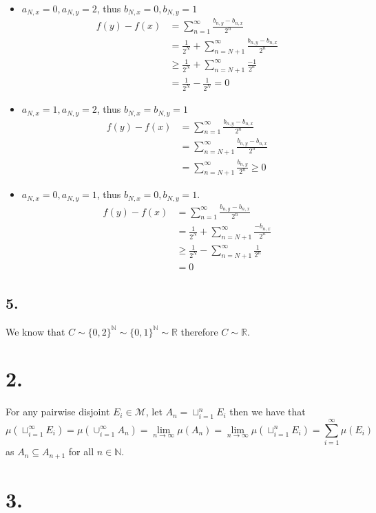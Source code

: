 \documentclass[11pt]{article}
\theoremstyle{mystyle}
\theoremstyle{definition}
\begin{document}
\begin{itemize}
  \item $a_{N,x} = 0, a_{N,y} = 2$, thus $b_{N,x} = 0 , b_{N,y} = 1$ 
    \begin{align*}
      f(y) - f(x) 
      &= \sum_{n=1}^\infty \frac{b_{n,y} - b_{n,x}}{2^n} \\
      &= \frac{1}{2^N}+\sum_{n=N+1}^\infty \frac{b_{n,y} - b_{n,x}}{2^n} \\
      &\ge \frac{1}{2^N} + \sum_{n=N+1}^\infty \frac{-1}{2^n} \\
      &= \frac{1}{2^N} - \frac{1}{2^N} = 0  
    \end{align*}
  \item $a_{N,x} = 1, a_{N,y} = 2$, thus $b_{N,x} = b_{N,y} = 1$ 
    \begin{align*}
      f(y) - f(x) 
      &= \sum_{n=1}^\infty \frac{b_{n,y} - b_{n,x}}{2^n} \\
      &= \sum_{n=N+1}^\infty \frac{b_{n,y} - b_{n,x}}{2^n} \\
      &= \sum_{n=N+1}^\infty \frac{b_{n,y}}{2^n} \ge 0
    \end{align*}
  \item $a_{N,x} = 0, a_{N,y} = 1$, thus $b_{N,x} = 0, b_{N,y} = 1$. 
    \begin{align*}
      f(y) - f(x) 
      &= \sum_{n=1}^\infty \frac{b_{n,y} - b_{n,x}}{2^n} \\
      &= \frac{1}{2^N}+\sum_{n=N+1}^\infty \frac{- b_{n,x}}{2^n} \\
      &\ge \frac{1}{2^N} - \sum_{n=N+1}^\infty \frac{1}{2^n} \\
      &= 0
    \end{align*}
\end{itemize}
\subsection*{5.}
We know that $C \sim \{0,2\}^\mathbb{N} \sim \{0,1\}^\mathbb{N} \sim \mathbb{R}$ therefore $C \sim \mathbb{R}$. 
\newpage
\section*{2.}
For any pairwise disjoint $E_i \in \mathcal{M}$, let $A_n = \sqcup_{i=1}^n E_i$ then we have that 
\[
  \mu(\sqcup_{i=1}^\infty E_i) = \mu(\cup_{i=1}^\infty A_n) = \lim_{n \to \infty}\mu(A_n) = \lim_{n \to \infty} \mu(\sqcup_{i=1}^n E_i) = \sum_{i=1}^\infty \mu(E_i) 
\]
as $A_n \subseteq A_{n+1}$ for all $n \in \mathbb{N}$. 
\newpage
\section*{3.}
\end{document}
